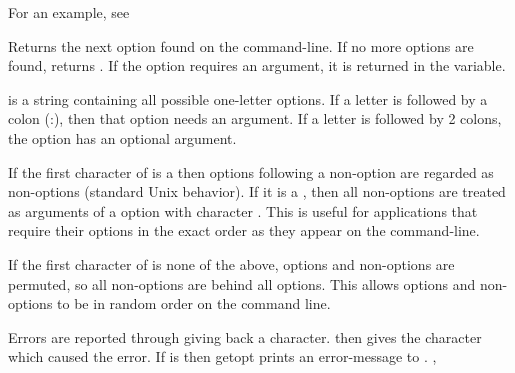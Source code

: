 For an example, see 

{
Returns the next option found on the command-line. If no more options are
found, returns . If the option requires an argument, it is
returned in the  variable.

 is a string containing all possible one-letter options.
If a letter is followed by a colon (:), then that option needs an argument.
If a letter is followed by 2 colons, the option has an optional argument.

If the first character of  is a  then options following a non-option are
regarded as non-options (standard Unix behavior). If it is a ,
then all non-options are treated as arguments of a option with character
. This is useful for applications that require their options in
the exact order as they appear on the command-line.

If the first character of  is none of the above, options
and non-options are permuted, so all non-options are behind all options.
This allows options and non-options to be in random order on the command
line.
}
{ 
Errors are reported through giving back a  character. 
then gives the character which caused the error. If  is
 then getopt prints an error-message to .
}
{, }

\html{}

